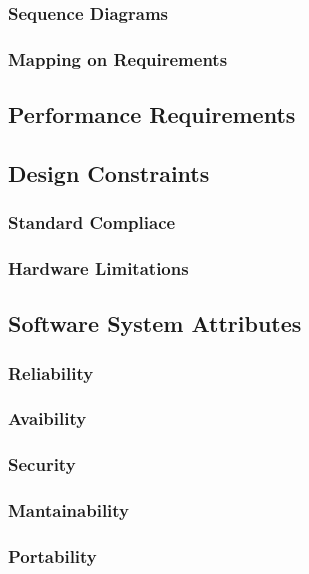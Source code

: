 	\subsubsection{Sequence Diagrams}
	\subsubsection{Mapping on Requirements}
\subsection{Performance Requirements}
\subsection{Design Constraints}
	\subsubsection{Standard Compliace}
	\subsubsection{Hardware Limitations}
\subsection{Software System Attributes}
	\subsubsection{Reliability}
	\subsubsection{Avaibility}
	\subsubsection{Security}
	\subsubsection{Mantainability}
	\subsubsection{Portability}